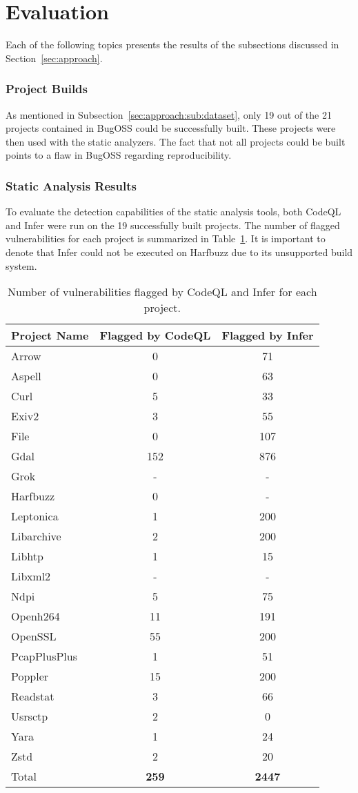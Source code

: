 \section{Evaluation}
\label{sec:eval}
Each of the following topics presents the results of the subsections discussed in Section~\ref{sec:approach}.

\subsubsection{Project Builds}
As mentioned in Subsection~\ref{sec:approach:sub:dataset}, only 19 out of the 21 projects contained in BugOSS could be successfully built. These projects were then used with the static analyzers. The fact that not all projects could be built points to a flaw in BugOSS regarding reproducibility.

\subsubsection{Static Analysis Results}
To evaluate the detection capabilities of the static analysis tools, both CodeQL and Infer were run on the 19 successfully built projects. The number of flagged vulnerabilities for each project is summarized in Table~\ref{sast_results}. It is important to denote that Infer could not be executed on Harfbuzz due to its unsupported build system.

\begin{table}[ht]
\centering
\caption{Number of vulnerabilities flagged by CodeQL and Infer for each project.}
\label{sast_results}
\begin{tabular}{|l|c|c|}
\hline
\textbf{Project Name} & \textbf{Flagged by CodeQL} & \textbf{Flagged by Infer} \\
\hline
Arrow & 0 & 71 \\
Aspell & 0 & 63 \\
Curl & 5 & 33 \\
Exiv2 & 3 & 55 \\
File & 0 & 107 \\
Gdal & 152 & 876 \\
Grok & - & - \\
Harfbuzz & 0 & - \\
Leptonica & 1 & 200 \\
Libarchive & 2 & 200 \\
Libhtp & 1 & 15 \\
Libxml2 & - & - \\
Ndpi & 5 & 75 \\
Openh264 & 11 & 191 \\
OpenSSL & 55 & 200 \\
PcapPlusPlus & 1 & 51 \\
Poppler & 15 & 200 \\
Readstat & 3 & 66 \\
Usrsctp & 2 & 0 \\
Yara & 1 & 24 \\
Zstd & 2 & 20 \\
\hline
Total & \textbf{259} & \textbf{2447} \\
\hline
\end{tabular}
\end{table}

